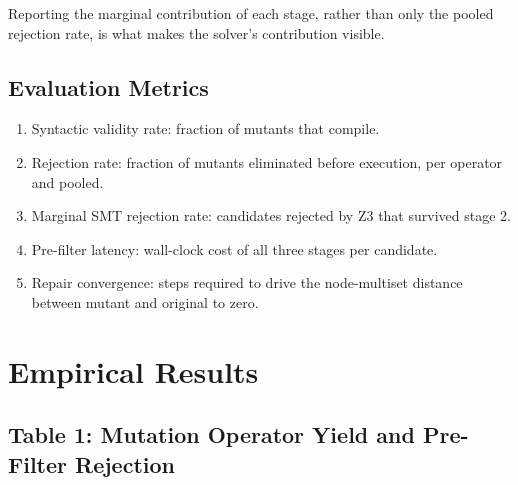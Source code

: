 \documentclass[10pt,journal,compsoc,twocolumn]{IEEEtran}
\begin{document}
Reporting the marginal contribution of each stage, rather than only the pooled rejection rate, is what makes the solver's contribution visible.


\subsection{Evaluation Metrics}


\begin{enumerate}
  \item Syntactic validity rate: fraction of mutants that compile.
  \item Rejection rate: fraction of mutants eliminated before execution, per operator and pooled.
  \item Marginal SMT rejection rate: candidates rejected by Z3 that survived stage 2.
  \item Pre-filter latency: wall-clock cost of all three stages per candidate.
  \item Repair convergence: steps required to drive the node-multiset distance between mutant and original to zero.
\end{enumerate}




\section{Empirical Results}



\subsection{Table 1: Mutation Operator Yield and Pre-Filter Rejection}
\begin{table}[htbp]
\centering
{}
\end{table}
\end{document}
